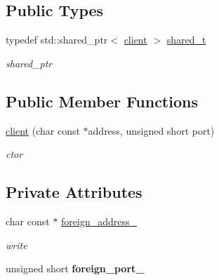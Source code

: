 \subsection*{\-Public \-Types}
\begin{DoxyCompactItemize}
\item 
\hypertarget{classgal_1_1network_1_1client_a87ba8d69e62ce4ee5895913bf597ad6f}{typedef std\-::shared\-\_\-ptr$<$ \hyperlink{classgal_1_1network_1_1client}{client} $>$ \hyperlink{classgal_1_1network_1_1client_a87ba8d69e62ce4ee5895913bf597ad6f}{shared\-\_\-t}}\label{classgal_1_1network_1_1client_a87ba8d69e62ce4ee5895913bf597ad6f}

\begin{DoxyCompactList}\small\item\em shared\-\_\-ptr \end{DoxyCompactList}\end{DoxyCompactItemize}
\subsection*{\-Public \-Member \-Functions}
\begin{DoxyCompactItemize}
\item 
\hypertarget{classgal_1_1network_1_1client_a85a7d1b17d3f72516ad76375c79d7bec}{\hyperlink{classgal_1_1network_1_1client_a85a7d1b17d3f72516ad76375c79d7bec}{client} (char const $\ast$address, unsigned short port)}\label{classgal_1_1network_1_1client_a85a7d1b17d3f72516ad76375c79d7bec}

\begin{DoxyCompactList}\small\item\em ctor \end{DoxyCompactList}\end{DoxyCompactItemize}
\subsection*{\-Private \-Attributes}
\begin{DoxyCompactItemize}
\item 
char const $\ast$ \hyperlink{classgal_1_1network_1_1client_a50f554a8893793fdd9e0a2d53b79f60e}{foreign\-\_\-address\-\_\-}
\begin{DoxyCompactList}\small\item\em write \end{DoxyCompactList}\item 
\hypertarget{classgal_1_1network_1_1client_acbf9159db97d571507ae2a241ee6af22}{unsigned short {\bfseries foreign\-\_\-port\-\_\-}}\label{classgal_1_1network_1_1client_acbf9159db97d571507ae2a241ee6af22}

\end{DoxyCompactItemize}


